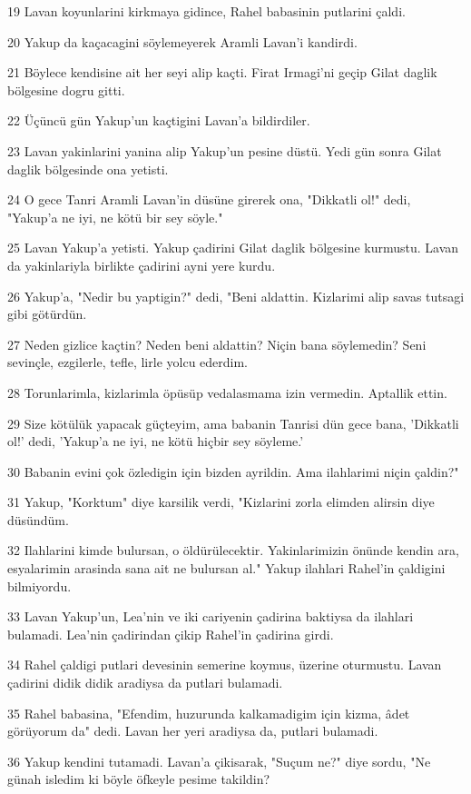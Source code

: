 \par 19 Lavan koyunlarini kirkmaya gidince, Rahel babasinin putlarini çaldi.
\par 20 Yakup da kaçacagini söylemeyerek Aramli Lavan'i kandirdi.
\par 21 Böylece kendisine ait her seyi alip kaçti. Firat Irmagi'ni geçip Gilat daglik bölgesine dogru gitti.
\par 22 Üçüncü gün Yakup'un kaçtigini Lavan'a bildirdiler.
\par 23 Lavan yakinlarini yanina alip Yakup'un pesine düstü. Yedi gün sonra Gilat daglik bölgesinde ona yetisti.
\par 24 O gece Tanri Aramli Lavan'in düsüne girerek ona, "Dikkatli ol!" dedi, "Yakup'a ne iyi, ne kötü bir sey söyle."
\par 25 Lavan Yakup'a yetisti. Yakup çadirini Gilat daglik bölgesine kurmustu. Lavan da yakinlariyla birlikte çadirini ayni yere kurdu.
\par 26 Yakup'a, "Nedir bu yaptigin?" dedi, "Beni aldattin. Kizlarimi alip savas tutsagi gibi götürdün.
\par 27 Neden gizlice kaçtin? Neden beni aldattin? Niçin bana söylemedin? Seni sevinçle, ezgilerle, tefle, lirle yolcu ederdim.
\par 28 Torunlarimla, kizlarimla öpüsüp vedalasmama izin vermedin. Aptallik ettin.
\par 29 Size kötülük yapacak güçteyim, ama babanin Tanrisi dün gece bana, 'Dikkatli ol!' dedi, 'Yakup'a ne iyi, ne kötü hiçbir sey söyleme.'
\par 30 Babanin evini çok özledigin için bizden ayrildin. Ama ilahlarimi niçin çaldin?"
\par 31 Yakup, "Korktum" diye karsilik verdi, "Kizlarini zorla elimden alirsin diye düsündüm.
\par 32 Ilahlarini kimde bulursan, o öldürülecektir. Yakinlarimizin önünde kendin ara, esyalarimin arasinda sana ait ne bulursan al." Yakup ilahlari Rahel'in çaldigini bilmiyordu.
\par 33 Lavan Yakup'un, Lea'nin ve iki cariyenin çadirina baktiysa da ilahlari bulamadi. Lea'nin çadirindan çikip Rahel'in çadirina girdi.
\par 34 Rahel çaldigi putlari devesinin semerine koymus, üzerine oturmustu. Lavan çadirini didik didik aradiysa da putlari bulamadi.
\par 35 Rahel babasina, "Efendim, huzurunda kalkamadigim için kizma, âdet görüyorum da" dedi. Lavan her yeri aradiysa da, putlari bulamadi.
\par 36 Yakup kendini tutamadi. Lavan'a çikisarak, "Suçum ne?" diye sordu, "Ne günah isledim ki böyle öfkeyle pesime takildin?
